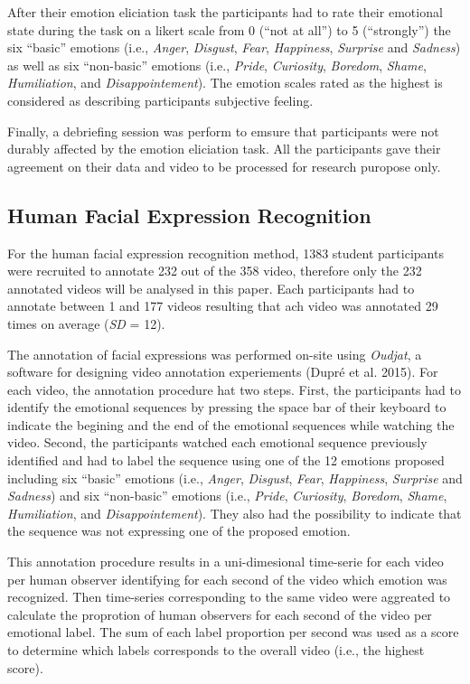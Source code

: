 \documentclass[conference,final,]{IEEEtran}
\begin{document}
After their emotion eliciation task the participants had to rate their
emotional state during the task on a likert scale from 0 (``not at
all'') to 5 (``strongly'') the six ``basic'' emotions (i.e.,
\emph{Anger}, \emph{Disgust}, \emph{Fear}, \emph{Happiness},
\emph{Surprise} and \emph{Sadness}) as well as six ``non-basic''
emotions (i.e., \emph{Pride}, \emph{Curiosity}, \emph{Boredom},
\emph{Shame}, \emph{Humiliation}, and \emph{Disappointement}). The
emotion scales rated as the highest is considered as describing
participants subjective feeling.

Finally, a debriefing session was perform to emsure that participants
were not durably affected by the emotion eliciation task. All the
participants gave their agreement on their data and video to be
processed for research puropose only.

\hypertarget{human-facial-expression-recognition}{%
\subsection{Human Facial Expression
Recognition}\label{human-facial-expression-recognition}}

For the human facial expression recognition method, 1383 student
participants were recruited to annotate 232 out of the 358 video,
therefore only the 232 annotated videos will be analysed in this paper.
Each participants had to annotate between 1 and 177 videos resulting
that ach video was annotated 29 times on average (\emph{SD} = 12).

The annotation of facial expressions was performed on-site using
\emph{Oudjat}, a software for designing video annotation experiements
(Dupré et al. 2015). For each video, the annotation procedure hat two
steps. First, the participants had to identify the emotional sequences
by pressing the space bar of their keyboard to indicate the begining and
the end of the emotional sequences while watching the video. Second, the
participants watched each emotional sequence previously identified and
had to label the sequence using one of the 12 emotions proposed
including six ``basic'' emotions (i.e., \emph{Anger}, \emph{Disgust},
\emph{Fear}, \emph{Happiness}, \emph{Surprise} and \emph{Sadness}) and
six ``non-basic'' emotions (i.e., \emph{Pride}, \emph{Curiosity},
\emph{Boredom}, \emph{Shame}, \emph{Humiliation}, and
\emph{Disappointement}). They also had the possibility to indicate that
the sequence was not expressing one of the proposed emotion.

This annotation procedure results in a uni-dimesional time-serie for
each video per human observer identifying for each second of the video
which emotion was recognized. Then time-series corresponding to the same
video were aggreated to calculate the proprotion of human observers for
each second of the video per emotional label. The sum of each label
proportion per second was used as a score to determine which labels
corresponds to the overall video (i.e., the highest score).
\end{document}
